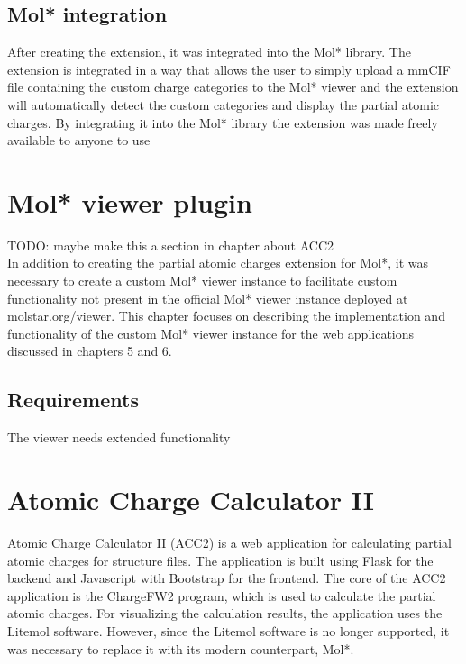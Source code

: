 \documentclass[
  digital,     %
  oneside,     %
  nosansbold,  %
  nocolorbold, %
  lof,         %
  lot,         %
]{fithesis4}
\begin{document}
\section{Mol* integration}

After creating the extension, it was integrated into the Mol* library. The extension is integrated in a way that allows the user to simply upload a mmCIF file containing the custom charge categories to the Mol* viewer and the extension will automatically detect the custom categories and display the partial atomic charges. By integrating it into the Mol* library the extension was made freely available to anyone to use

\chapter{Mol* viewer plugin}
\label{chapter:molstar_viewer_plugin}

TODO: maybe make this a section in chapter about ACC2 \\

In addition to creating the partial atomic charges extension for Mol*, it was necessary to create a custom Mol* viewer instance to facilitate custom functionality not present in the official Mol* viewer instance deployed at molstar.org/viewer. This chapter focuses on describing the implementation and functionality of the custom Mol* viewer instance for the web applications discussed in chapters 5 and 6.

\section{Requirements}

The viewer needs extended functionality

\chapter{Atomic Charge Calculator II}
\label{chapter:atomic_charge_calculator_ii}

Atomic Charge Calculator II (ACC2) is a web application for calculating partial atomic charges for structure files. The application is built using Flask for the backend and Javascript with Bootstrap for the frontend. The core of the ACC2 application is the ChargeFW2 program, which is used to calculate the partial atomic charges. For visualizing the calculation results, the application uses the Litemol software. \parencite{racek2020acc2} However, since the Litemol software is no longer supported, it was necessary to replace it with its modern counterpart, Mol*.
\end{document}
